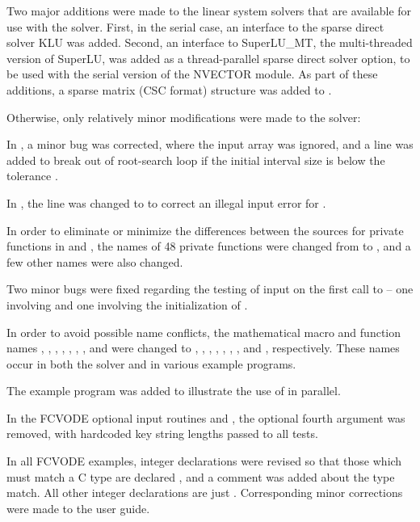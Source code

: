 Two major additions were made to the linear system solvers that are
available for use with the {\cvode} solver.  First, in the serial case,
an interface to the sparse direct solver KLU was added.
Second, an interface to SuperLU\_MT, the multi-threaded version of
SuperLU, was added as a thread-parallel sparse direct solver option,
to be used with the serial version of the NVECTOR module.
As part of these additions, a sparse matrix (CSC format) structure 
was added to {\cvode}.

Otherwise, only relatively minor modifications were made to the
{\cvode} solver:

In , a minor bug was corrected, where the input
array  was ignored, and a line was added to break out of
root-search loop if the initial interval size is below the tolerance
.

In , the line  was changed to
 to correct an illegal input error for .

In order to eliminate or minimize the differences between the sources
for private functions in {\cvode} and {\cvodes}, the names of 48
private functions were changed from  to , and a few
other names were also changed.

Two minor bugs were fixed regarding the testing of input on the first
call to  -- one involving  and one involving the
initialization of .

In order to avoid possible name conflicts, the mathematical macro
and function names , , , , ,
, , and  were changed to
, , , , ,
, , and , respectively.
These names occur in both the solver and in various example programs.

The example program  was added to illustrate
the use of  in parallel.

In the FCVODE optional input routines  and ,
the optional fourth argument  was removed, with
hardcoded key string lengths passed to all  tests.

In all FCVODE examples, integer declarations were revised so that
those which must match a C type  are declared ,
and a comment was added about the type match.  All other integer
declarations are just .  Corresponding minor corrections were
made to the user guide.


